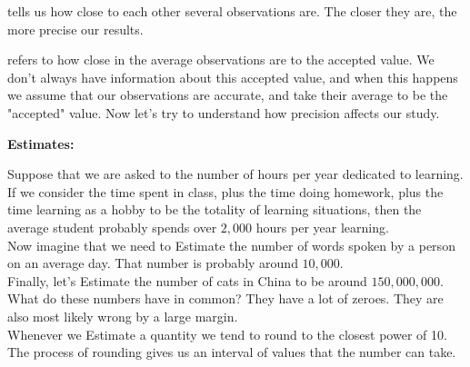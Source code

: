  tells us how close to each other several observations are. The closer they are, the more precise our results.

 refers to how close in the average observations are to the accepted value. We don't always have information about this accepted value, and when this happens we assume that our observations are accurate, and take their average to be the "accepted" value.
\vspace{0.5cm}
\noindent Now let's try to understand how precision affects our study. 

\begin{center}
\textbf{Estimates:}
\end{center}

Suppose that we are asked to  the number of hours per year dedicated to learning. If we consider the time spent in class, plus the time doing homework, plus the time learning as a hobby to be the totality of learning situations, then the average student probably spends over \(2,000\) hours per year learning.
\\

\noindent Now imagine that we need to Estimate the number of words spoken by a person on an average day. That number is probably around \(10,000\).
\\
Finally, let's Estimate the number of cats in China to be around \(150,000,000\).
\\
What do these numbers have in common? They have a lot of zeroes.
They are also most likely wrong by a large margin.
\\

\noindent Whenever we Estimate a quantity we tend to round to the closest power of 10. The process of rounding gives us an interval of values that the number can take.

